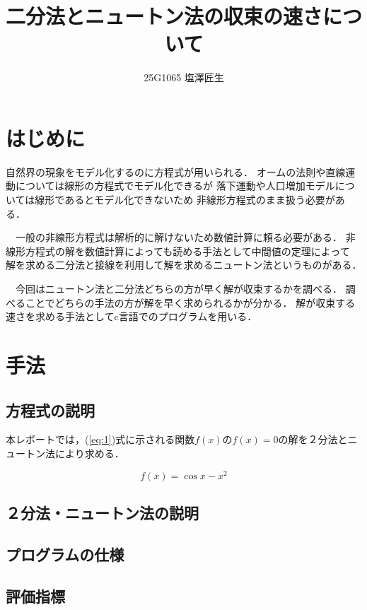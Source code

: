 \documentclass[uplatex]{jsarticle}
\begin{document}
\title{二分法とニュートン法の収束の速さについて}
\author{25G1065 塩澤匠生}

\maketitle


\section{はじめに}
自然界の現象をモデル化するのに方程式が用いられる．
オームの法則や直線運動については線形の方程式でモデル化できるが
落下運動や人口増加モデルについては線形であるとモデル化できないため
非線形方程式のまま扱う必要がある．


　一般の非線形方程式は解析的に解けないため数値計算に頼る必要がある．
非線形方程式の解を数値計算によっても読める手法として中間値の定理によって
解を求める二分法と接線を利用して解を求めるニュートン法というものがある．


　今回はニュートン法と二分法どちらの方が早く解が収束するかを調べる．
調べることでどちらの手法の方が解を早く求められるかが分かる．
解が収束する速さを求める手法としてc言語でのプログラムを用いる．
\section{手法}

\subsection{方程式の説明}

本レポートでは，(\ref{eq:1})式に示される関数$f(x)$の$f(x)=0$の解を２分法とニュートン法により求める．

\begin{equation}
f(x)=\cos x- x^2\label{eq:1}
\end{equation}

\subsection{２分法・ニュートン法の説明}

\subsection{プログラムの仕様}

\subsection{評価指標}
\end{document}
